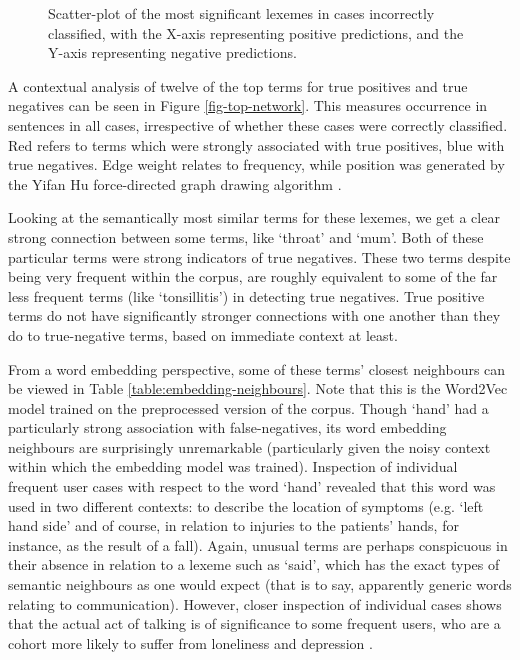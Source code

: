 \begin{landscape}
   \begin{figure}[]
   
      \centering
      \caption{Scatter-plot of the most significant lexemes in cases incorrectly classified, with the X-axis representing positive predictions, and the Y-axis representing negative predictions.}
      \label{fig-false-results}
   \end{figure}
\end{landscape} 

A contextual analysis of twelve of the top terms for true positives and true negatives can be seen in Figure \ref{fig-top-network}. This measures occurrence in sentences in all cases, irrespective of whether these cases were correctly classified. Red refers to terms which were strongly associated with true positives, blue with true negatives. Edge weight relates to frequency, while position was generated by the Yifan Hu force-directed graph drawing algorithm \cite{hu2005efficient}.    



Looking at the semantically most similar terms for these lexemes, we get a clear strong connection between some terms, like `throat' and `mum'. Both of these particular terms were strong indicators of true negatives. These two terms despite being very frequent within the corpus, are roughly equivalent to some of the far less frequent terms (like `tonsillitis') in detecting true negatives. True positive terms do not have significantly stronger connections with one another than they do to true-negative terms, based on immediate context at least.

From a word embedding perspective, some of these terms' closest neighbours can be viewed in Table \ref{table:embedding-neighbours}. Note that this is the Word2Vec model trained on the preprocessed version of the corpus. Though `hand' had a particularly strong association with false-negatives, its word embedding neighbours are surprisingly unremarkable (particularly given the noisy context within which the embedding model was trained).  Inspection of individual frequent user cases with respect to the word `hand' revealed that this word was used in two different contexts: to describe the location of symptoms (e.g. `left hand side' and of course, in relation to injuries to the patients' hands, for instance, as the result of a fall). Again, unusual terms are perhaps conspicuous in their absence in relation to a lexeme such as `said', which has the exact types of semantic neighbours as one would expect (that is to say, apparently generic words relating to communication). However, closer inspection of individual cases shows that the actual act of talking is of significance to some frequent users, who are a cohort more likely to suffer from loneliness and depression \cite{agarwal2019social}.


